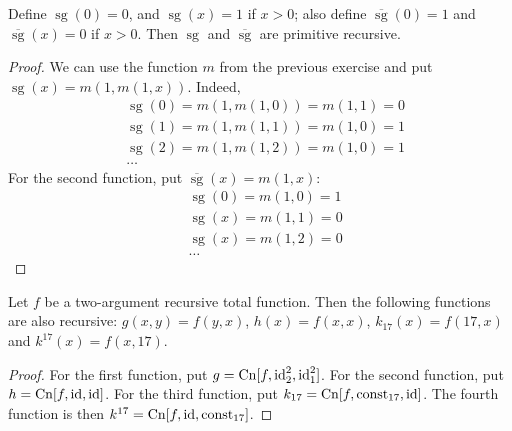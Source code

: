 \begin{exercise}
  \newcommand{\sg}{\operatorname{sg}}
  \newcommand{\sgb}{\overline{\operatorname{sg}}}
  Define $\sg(0) = 0$, and $\sg(x) = 1$ if $x > 0$; also define $\sgb(0) = 1$ and $\sgb(x)  = 0$ if $x > 0$.
  Then $\sg$ and $\sgb$ are primitive recursive.
  \begin{proof}
    We can use the function $m$ from the previous exercise and put $\sg(x) = m(1, m(1, x))$.
    Indeed,
    \begin{align*}
      &\sg(0) = m(1, m(1, 0)) = m(1, 1) = 0\\
      &\sg(1) = m(1, m(1, 1)) = m(1, 0) = 1\\
      &\sg(2) = m(1, m(1, 2)) = m(1, 0) = 1\\
      &\ldots
    \end{align*}
    For the second function, put $\sgb(x) = m(1, x)$:
    \begin{align*}
      &\sg(0) = m(1, 0) = 1\\
      &\sg(x) = m(1, 1) = 0\\
      &\sg(x) = m(1, 2) = 0\\
      &\ldots
    \end{align*}
  \end{proof}
\end{exercise}

\begin{exercise}[6.1]
  Let $f$ be a two-argument recursive total function.
  Then the following functions are also recursive: $g(x,y)=f(y,x)$, $h(x)=f(x,x)$, $k_{17}(x)=f(17,x)$ and $k^{17}(x)=f(x,17)$.
\end{exercise}
\begin{proof}
  For the first function, put $g = \operatorname{Cn}[f, \operatorname{id}_2^2, \operatorname{id}_1^2]$.
  For the second function, put $h = \operatorname{Cn}[f, \operatorname{id}, \operatorname{id}]$.
  For the third function, put $k_{17} = \operatorname{Cn}[f, \operatorname{const}_{17}, \operatorname{id}]$.
  The fourth function is then $k^{17} = \operatorname{Cn}[f, \operatorname{id}, \operatorname{const}_{17}]$.
\end{proof}

